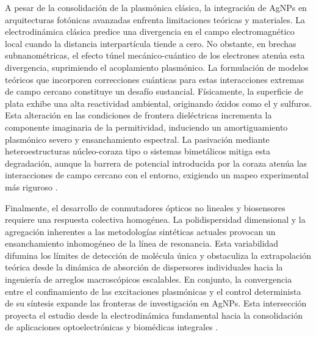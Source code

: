 A pesar de la consolidación de la plasmónica clásica, la integración de AgNPs en
arquitecturas fotónicas avanzadas enfrenta limitaciones teóricas y materiales.
La electrodinámica clásica predice una divergencia en el campo electromagnético
local cuando la distancia interpartícula tiende a cero. No obstante, en brechas
subnanométricas, el efecto túnel mecánico-cuántico de los electrones atenúa
esta divergencia, suprimiendo el acoplamiento plasmónico. La formulación de
modelos teóricos que incorporen correcciones cuánticas para estas interacciones
extremas de campo cercano constituye un desafío sustancial. Físicamente, la
superficie de plata exhibe una alta reactividad ambiental, originando óxidos
como el  y sulfuros. Esta alteración en las condiciones de frontera
dieléctricas incrementa la componente imaginaria de la permitividad, induciendo
un amortiguamiento plasmónico severo y ensanchamiento espectral. La pasivación
mediante heteroestructuras núcleo-coraza tipo  o sistemas
bimetálicos  mitiga esta degradación, aunque la barrera de potencial
introducida por la coraza atenúa las interacciones de campo cercano con el
entorno, exigiendo un mapeo experimental más riguroso
\cite{chevychelovaNonlinearOpticalProperties2021,
silva-silvaBiosynthesisAgAuBimetallic2023}.

Finalmente, el desarrollo de conmutadores ópticos no lineales y biosensores
requiere una respuesta colectiva homogénea. La polidispersidad dimensional y la
agregación inherentes a las metodologías sintéticas actuales provocan un
ensanchamiento inhomogéneo de la línea de resonancia. Esta variabilidad
difumina los límites de detección de molécula única y obstaculiza la
extrapolación teórica desde la dinámica de absorción de dispersores individuales
\cite{elimLargeNonlinearAbsorption2021} hacia la ingeniería de arreglos
macroscópicos escalables. En conjunto, la convergencia entre el confinamiento
de las excitaciones plasmónicas y el control determinista de su síntesis
expande las fronteras de investigación en AgNPs. Esta intersección proyecta el
estudio desde la electrodinámica fundamental hacia la consolidación de
aplicaciones optoelectrónicas y biomédicas integrales
\cite{chaoOpticalPropertiesApplications2024}.
